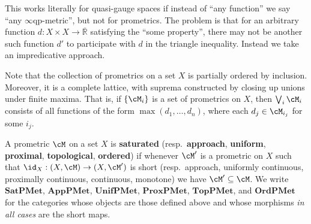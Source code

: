 \documentclass{article}
\def\Qp{\mathbb{Q}^+}
\def\R{\mathbb{R}}
\def\Re{\overline{\R}}
\def\eqp{$\infty$qp}
\def\TopPMet{\mathbf{TopPMet}}
\def\UnifPMet{\mathbf{UnifPMet}}
\def\ProxPMet{\mathbf{ProxPMet}}
\def\AppPMet{\mathbf{AppPMet}}
\def\OrdPMet{\mathbf{OrdPMet}}
\def\SatPMet{\mathbf{SatPMet}}
\begin{document}
This works literally for quasi-gauge spaces if instead of ``any function'' we say ``any \eqp-metric'', but not for prometrics.
The problem is that for an arbitrary function $d:X\times X \to \Re$ satisfying the ``some property'', there may not be another such function $d'$ to participate with $d$ in the triangle inequality.
Instead we take an impredicative approach.

Note that the collection of prometrics on a set $X$ is partially ordered by inclusion.
Moreover, it is a complete lattice, with suprema constructed by closing up unions under finite maxima.
That is, if $\{\cM_i\}$ is a set of prometrics on $X$, then $\bigvee_i \cM_i$ consists of all functions of the form $\max(d_1,\dots,d_n)$, where each $d_j \in \cM_{i_j}$ for some $i_j$.

\begin{defn}
  A prometric $\cM$ on a set $X$ is \textbf{saturated} (resp.\ \textbf{approach}, \textbf{uniform}, \textbf{proximal}, \textbf{topological}, \textbf{ordered}) if whenever $\cM'$ is a prometric on $X$ such that $\id_X:(X,\cM) \to (X,\cM')$ is short (resp.\ approach, uniformly continuous, proximally continuous, continuous, monotone) we have $\cM'\subseteq \cM$.
  We write $\SatPMet$, $\AppPMet$, $\UnifPMet$, $\ProxPMet$, $\TopPMet$, and $\OrdPMet$ for the categories whose objects are those defined above and whose morphisms \emph{in all cases} are the short maps.
\end{defn}
\end{document}
